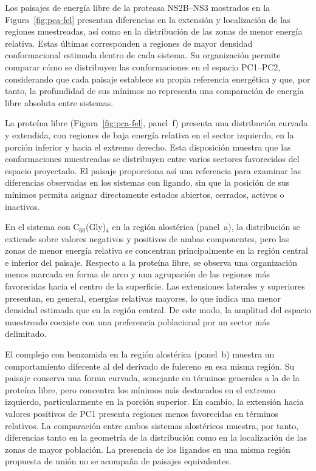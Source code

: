 Los paisajes de energía libre de la proteasa NS2B--NS3 mostrados en la Figura~\ref{fig:pca-fel} presentan diferencias en la extensión y localización de las regiones muestreadas, así como en la distribución de las zonas de menor energía relativa. Estas últimas corresponden a regiones de mayor densidad conformacional estimada dentro de cada sistema. Su organización permite comparar cómo se distribuyen las conformaciones en el espacio PC1--PC2, considerando que cada paisaje establece su propia referencia energética y que, por tanto, la profundidad de sus mínimos no representa una comparación de energía libre absoluta entre sistemas.

La proteína libre (Figura~\ref{fig:pca-fel}, panel~f) presenta una distribución curvada y extendida, con regiones de baja energía relativa en el sector izquierdo, en la porción inferior y hacia el extremo derecho. Esta disposición muestra que las conformaciones muestreadas se distribuyen entre varios sectores favorecidos del espacio proyectado. El paisaje proporciona así una referencia para examinar las diferencias observadas en los sistemas con ligando, sin que la posición de sus mínimos permita asignar directamente estados abiertos, cerrados, activos o inactivos.

En el sistema con C$_{60}$(Gly)$_4$ en la región alostérica (panel~a), la distribución se extiende sobre valores negativos y positivos de ambas componentes, pero las zonas de menor energía relativa se concentran principalmente en la región central e inferior del paisaje. Respecto a la proteína libre, se observa una organización menos marcada en forma de arco y una agrupación de las regiones más favorecidas hacia el centro de la superficie. Las extensiones laterales y superiores presentan, en general, energías relativas mayores, lo que indica una menor densidad estimada que en la región central. De este modo, la amplitud del espacio muestreado coexiste con una preferencia poblacional por un sector más delimitado.

El complejo con benzamida en la región alostérica (panel~b) muestra un comportamiento diferente al del derivado de fulereno en esa misma región. Su paisaje conserva una forma curvada, semejante en términos generales a la de la proteína libre, pero concentra los mínimos más destacados en el extremo izquierdo, particularmente en la porción superior. En cambio, la extensión hacia valores positivos de PC1 presenta regiones menos favorecidas en términos relativos. La comparación entre ambos sistemas alostéricos muestra, por tanto, diferencias tanto en la geometría de la distribución como en la localización de las zonas de mayor población. La presencia de los ligandos en una misma región propuesta de unión no se acompaña de paisajes equivalentes.

